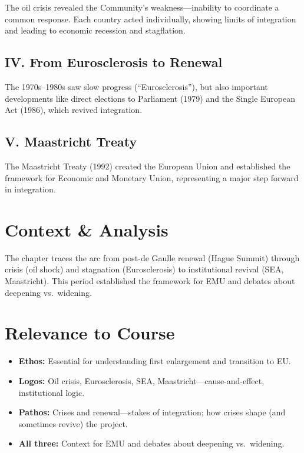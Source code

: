 \documentclass[11pt,a4paper]{article}
\begin{document}
The oil crisis revealed the Community's weakness---inability to coordinate a common response. Each country acted individually, showing limits of integration and leading to economic recession and stagflation.

\subsection*{IV. From Eurosclerosis to Renewal}

The 1970s--1980s saw slow progress (``Eurosclerosis''), but also important developments like direct elections to Parliament (1979) and the Single European Act (1986), which revived integration.

\subsection*{V. Maastricht Treaty}

The Maastricht Treaty (1992) created the European Union and established the framework for Economic and Monetary Union, representing a major step forward in integration.

\section*{Context \& Analysis}

The chapter traces the arc from post-de Gaulle renewal (Hague Summit) through crisis (oil shock) and stagnation (Eurosclerosis) to institutional revival (SEA, Maastricht). This period established the framework for EMU and debates about deepening vs.\ widening.

\section*{Relevance to Course}

\begin{itemize}
\item \textbf{Ethos:} Essential for understanding first enlargement and transition to EU.
\item \textbf{Logos:} Oil crisis, Eurosclerosis, SEA, Maastricht---cause-and-effect, institutional logic.
\item \textbf{Pathos:} Crises and renewal---stakes of integration; how crises shape (and sometimes revive) the project.
\item \textbf{All three:} Context for EMU and debates about deepening vs.\ widening.
\end{itemize}
\end{document}
